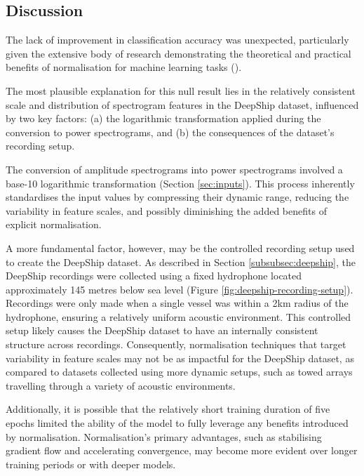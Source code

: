 \subsection{Discussion}

The lack of improvement in classification accuracy was unexpected, particularly given the extensive body of research demonstrating the theoretical and practical benefits of normalisation for machine learning tasks (\cite{chris_kroenke_normalizing_2022, gunes_answer_2020, wu_group_2018, primus_frequency-wise_2023, simic_normalization_2023}).

The most plausible explanation for this null result lies in the relatively consistent scale and distribution of spectrogram features in the DeepShip dataset, influenced by two key factors: (a) the logarithmic transformation applied during the conversion to power spectrograms, and (b) the consequences of the dataset's recording setup.

The conversion of amplitude spectrograms into power spectrograms involved a base-10 logarithmic transformation (Section \ref{sec:inputs}). This process inherently standardises the input values by compressing their dynamic range, reducing the variability in feature scales, and possibly diminishing the added benefits of explicit normalisation.

A more fundamental factor, however, may be the controlled recording setup used to create the DeepShip dataset. As described in Section \ref{subsubsec:deepship}, the DeepShip recordings were collected using a fixed hydrophone located approximately 145 metres below sea level (Figure \ref{fig:deepship-recording-setup}). Recordings were only made when a single vessel was within a 2km radius of the hydrophone, ensuring a relatively uniform acoustic environment. This controlled setup likely causes the DeepShip dataset to have an internally consistent structure across recordings. Consequently, normalisation techniques that target variability in feature scales may not be as impactful for the DeepShip dataset, as compared to datasets collected using more dynamic setups, such as towed arrays travelling through a variety of acoustic environments.

Additionally, it is possible that the relatively short training duration of five epochs limited the ability of the model to fully leverage any benefits introduced by normalisation. Normalisation's primary advantages, such as stabilising gradient flow and accelerating convergence, may become more evident over longer training periods or with deeper models.

